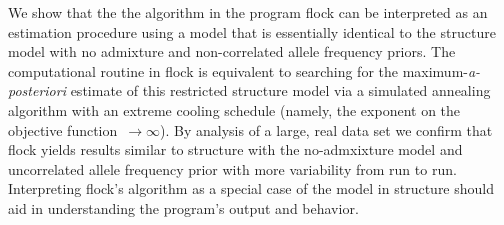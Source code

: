 
      We show that the the algorithm in the program {\sc flock} \citep{Duc&Tur2009} can be
interpreted as an estimation procedure using  
a model that is essentially identical to the {\sc structure} 
\citep{Pritchardetal2000} model with no admixture and non-correlated 
allele frequency priors. The computational routine in {\sc flock} is 
equivalent to searching for the maximum-{\em a-posteriori}
estimate of this restricted {\sc structure} model via a simulated 
annealing algorithm with an extreme cooling 
schedule (namely, the exponent on the objective function~$\rightarrow \infty$).  By analysis of a large, real data set we
confirm that {\sc flock} yields results similar to {\sc structure} with the no-admxixture
model and uncorrelated allele frequency prior with more variability 
from run to run. Interpreting {\sc flock}'s algorithm as a special case of the model in 
{\sc structure} should aid in  understanding the program's output and behavior. 
